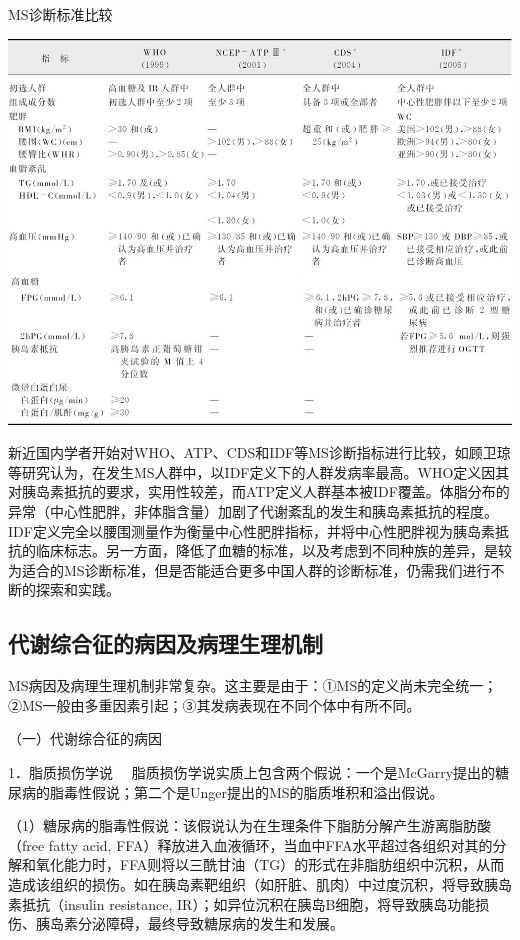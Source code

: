 \begin{table}[htbp]
\centering
\caption{MS诊断标准比较}
\label{tab3-1}
\includegraphics{./images/Image00016.jpg}
\end{table}



新近国内学者开始对WHO、ATP、CDS和IDF等MS诊断指标进行比较，如顾卫琼等研究认为，在发生MS人群中，以IDF定义下的人群发病率最高。WHO定义因其对胰岛素抵抗的要求，实用性较差，而ATP定义人群基本被IDF覆盖。体脂分布的异常（中心性肥胖，非体脂含量）加剧了代谢紊乱的发生和胰岛素抵抗的程度。IDF定义完全以腰围测量作为衡量中心性肥胖指标，并将中心性肥胖视为胰岛素抵抗的临床标志。另一方面，降低了血糖的标准，以及考虑到不同种族的差异，是较为适合的MS诊断标准，但是否能适合更多中国人群的诊断标准，仍需我们进行不断的探索和实践。

\hypertarget{text00004.htmlux5cux23mllj4}{%
\subsection{代谢综合征的病因及病理生理机制}\label{text00004.htmlux5cux23mllj4}}

MS病因及病理生理机制非常复杂。这主要是由于：①MS的定义尚未完全统一；②MS一般由多重因素引起；③其发病表现在不同个体中有所不同。

（一）代谢综合征的病因

{1．脂质损伤学说}
　脂质损伤学说实质上包含两个假说：一个是McGarry提出的糖尿病的脂毒性假说；第二个是Unger提出的MS的脂质堆积和溢出假说。

（1）糖尿病的脂毒性假说：该假说认为在生理条件下脂肪分解产生游离脂肪酸（free
fatty acid,
FFA）释放进入血液循环，当血中FFA水平超过各组织对其的分解和氧化能力时，FFA则将以三酰甘油（TG）的形式在非脂肪组织中沉积，从而造成该组织的损伤。如在胰岛素靶组织（如肝脏、肌肉）中过度沉积，将导致胰岛素抵抗（insulin
resistance,
IR）；如异位沉积在胰岛B细胞，将导致胰岛功能损伤、胰岛素分泌障碍，最终导致糖尿病的发生和发展。

